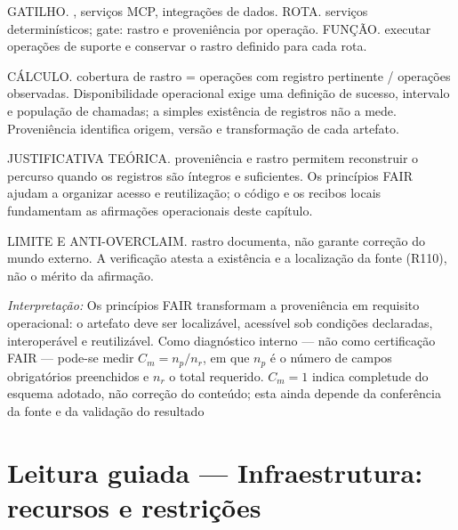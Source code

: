 \begin{processo}
GATILHO. , serviços MCP, integrações de dados.
ROTA. serviços determinísticos; gate: rastro e proveniência por operação.
FUNÇÃO. executar operações de suporte e conservar o rastro definido para cada rota.
\end{processo}

\begin{resultado}
CÁLCULO. cobertura de rastro = operações com registro pertinente / operações
observadas. Disponibilidade operacional exige uma definição de sucesso,
intervalo e população de chamadas; a simples existência de registros não a mede.
Proveniência identifica origem, versão e transformação de cada artefato.
\end{resultado}

\begin{descricao}
JUSTIFICATIVA TEÓRICA. proveniência e rastro permitem reconstruir o percurso
quando os registros são íntegros e suficientes. Os princípios FAIR ajudam a
organizar acesso e reutilização; o código e os recibos locais fundamentam as
afirmações operacionais deste capítulo.
\end{descricao}

\begin{aviso}
LIMITE E ANTI-OVERCLAIM. rastro documenta, não garante correção do mundo externo. A verificação atesta a existência e a
localização da fonte (R110), não o mérito da afirmação.
\end{aviso}

\noindent\textit{Interpretação:} Os princípios FAIR transformam a proveniência em requisito operacional: o artefato deve ser localizável, acessível sob condições declaradas, interoperável e reutilizável. Como diagnóstico interno — não como certificação FAIR — pode-se medir $C_m=n_p/n_r$, em que $n_p$ é o número de campos obrigatórios preenchidos e $n_r$ o total requerido. $C_m=1$ indica completude do esquema adotado, não correção do conteúdo; esta ainda depende da conferência da fonte e da validação do resultado \section[Leitura guiada]{Leitura guiada — Infraestrutura: recursos e restrições}

